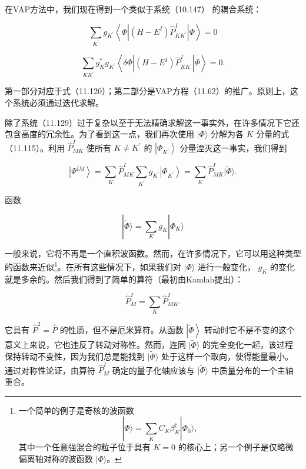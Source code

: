 在VAP方法中，我们现在得到一个类似于系统（10.147） \cite{Ze67}的耦合系统：

\[
\mathop{\sum}\limits_{{K}^{\prime}}{g}_{{K}^{\prime}}\left\langle {\Phi\left|{\left({H-{E}^{I}}\right){\widehat{P}}^{I}_{K{K}^{\prime}}}\right|\Phi}\right\rangle =0
\]

\[
\mathop{\sum}\limits_{{K{K}^{\prime}}}{g}^{*}_{K}{g}_{{K}^{\prime}}\left\langle {{\delta\Phi}\left|{\left({H-{E}^{I}}\right){\widehat{P}}^{I}_{K{K}^{\prime}}}\right|\Phi}\right\rangle =0.\tag{11.129}
\]

第一部分对应于式（11.120）；第二部分是VAP方程（11.62）的推广。原则上，这个系统必须通过迭代求解。

除了系统（11.129）过于复杂以至于无法精确求解这一事实外，在许多情况下它还包含高度的冗余性。为了看到这一点，我们再次使用 $|\Phi\rangle$
分解为各 $K$ 分量的式（11.115）。利用 ${\widehat{P}}^{I}_{MK}$ 使所有 $K\neq{K}^{\prime}$
的 $\left|{\Phi}_{{K}^{\prime}}\right\rangle $ 分量湮灭这一事实，我们得到

\[
\left|{\Psi}^{IM}\right\rangle =\mathop{\sum}\limits_{K}{\widehat{P}}^{I}_{MK}\mathop{\sum}\limits_{{K}^{\prime}}{g}_{{K}^{\prime}}\left|{\Phi}_{{K}^{\prime}}\right\rangle =\mathop{\sum}\limits_{K}{\widehat{P}}^{I}_{MK}|\widetilde{\Phi}\rangle.\tag{11.130}
\]

函数

\[
|\widetilde{\Phi}\rangle=\mathop{\sum}\limits_{K}{g}_{K}|{\Phi}_{K}\rangle\tag{11.131}
\]

一般来说，它将不再是一个直积波函数。然而，在许多情况下，它可以用这种类型的函数来近似\footnote{一个简单的例子是奇核的波函数
\[
|\Phi\rangle=\sum_{K}C_{K}\beta^{\dagger}_{K}|\Phi_{0}\rangle,
\]
其中一个任意强混合的粒子位于具有 $K=0$ 的核心上；另一个例子是仅略微偏离轴对称的波函数 $|\Phi\rangle$。}。在所有这些情况下，如果我们对 $|\Phi\rangle$ 进行一般变化， ${g}_{K}$ 的变化就是多余的。然后我们得到了简单的算符（最初由Kamlah\cite{Ka68}提出）：

\[
{\widehat{P}}^{I}_{M}=\mathop{\sum}\limits_{K}{\widehat{P}}^{I}_{MK}.\tag{11.132}
\]

它具有 ${\widehat{P}}^{2}=\widehat{P}$ 的性质，但不是厄米算符。从函数 $\left|\widetilde{\Phi}\right\rangle $
转动时它不是不变的这个意义上来说，它也违反了转动对称性\cite{So77}。然而，连同 $|\widetilde{\Phi}\rangle$
的完全变化一起，该过程保持转动不变性，因为我们总是能找到 $|\widetilde{\Phi}\rangle$ 处于这样一个取向，使得能量最小。通过对称性论证，由算符
${\widehat{P}}^{I}_{M}$ 确定的量子化轴应该与 $|\widetilde{\Phi}\rangle$ 中质量分布的一个主轴重合。

